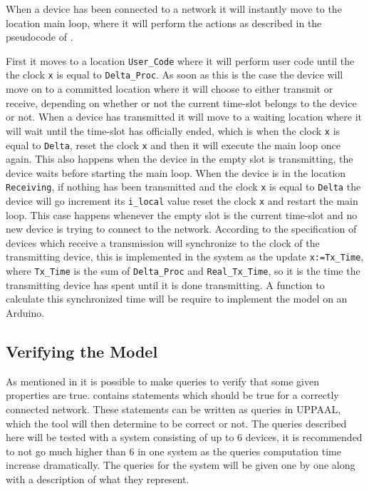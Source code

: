 When a device has been connected to a network it will instantly move to the location main loop, where it will perform the actions as described in the pseudocode of .

First it moves to a location \texttt{User\_Code} where it will perform user code until the the clock \texttt{x} is equal to \texttt{Delta\_Proc}.
As soon as this is the case the device will move on to a committed location where it will choose to either transmit or receive, depending on whether or not the current time-slot belongs to the device or not.
When a device has transmitted it will move to a waiting location where it will wait until the time-slot has officially ended, which is when the clock \texttt{x} is equal to \texttt{Delta}, reset the clock \texttt{x} and then it will execute the main loop once again.
This also happens when the device in the empty slot is transmitting, the device waits before starting the main loop.
When the device is in the location \texttt{Receiving}, if nothing has been transmitted and the clock \texttt{x} is equal to \texttt{Delta} the device will go increment its \texttt{i\_local} value reset the clock \texttt{x} and restart the main loop. 
This case happens whenever the empty slot is the current time-slot and no new device is trying to connect to the network.
According to the specification of  devices which receive a transmission will synchronize to the clock of the transmitting device, this is implemented in the system as the update \texttt{x:=Tx\_Time}, where \texttt{Tx\_Time} is the sum of \texttt{Delta\_Proc} and \texttt{Real\_Tx\_Time}, so it is the time the transmitting device has spent until it is done transmitting.
A function to calculate this synchronized time will be require to implement the model on an Arduino.

\subsection{Verifying the Model}\label{sec:verifyingTheModel}

As mentioned in  it is possible to make queries to verify that some given properties are true.
 contains statements which should be true for a correctly connected network.
These statements can be written as queries in UPPAAL, which the tool will then determine to be correct or not. 
The queries described here will be tested with a system consisting of up to 6 devices, it is recommended to not go much higher than 6 in one system as the queries computation time increase dramatically.
The queries for the system will be given one by one along with a description of what they represent.

